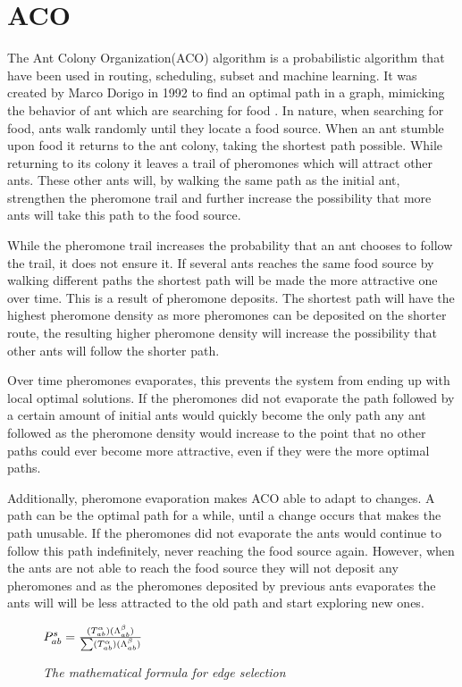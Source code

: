  
\section{ACO}
The Ant Colony Organization(ACO) algorithm is a probabilistic algorithm that have been used in routing, scheduling, 
subset and machine learning. It was created by Marco Dorigo in 1992 to find an optimal path in a graph, mimicking the
behavior of ant which are searching for food \cite{aco}. In nature, when searching for food, ants walk randomly until
they locate a food source. When an ant stumble upon food it returns to the ant colony, taking the shortest path possible.
While returning to its colony it leaves a trail of pheromones which will attract other ants. These other ants will, by walking
the same path as the initial ant, strengthen the pheromone trail and further increase the possibility that more ants will
take this path to the food source.

While the pheromone trail increases the probability that an ant chooses to follow the trail, it does not ensure it.
If several ants reaches the same food source by walking different paths the shortest path will be made the more attractive
one over time. This is a result of pheromone deposits. The shortest path will have the highest pheromone density as more
pheromones can be deposited on the shorter route, the resulting higher pheromone density will increase the possibility that 
other ants will follow the shorter path. 

Over time pheromones evaporates, this prevents the system from ending up with local optimal solutions. 
If the pheromones did not evaporate the path followed by a certain amount of initial ants
would quickly become the only path any ant followed as the pheromone density would increase to the point that no other paths
could ever become more attractive, even if they were the more optimal paths. 

Additionally, pheromone evaporation makes ACO able to adapt to changes. A path can be the optimal path for a while, until a change
occurs that makes the path unusable. If the pheromones did not evaporate the ants would continue to follow this path indefinitely,
never reaching the food source again. However, when the ants are not able to reach the food source they will not deposit any
pheromones and as the pheromones deposited by previous ants evaporates the ants will will be less attracted to the old path
and start exploring new ones.
 

\begin{figure}[h]
\centering
\begin{math}
P^s_{ab} = {(T^\alpha_{ab})(\Lambda^\beta_{ab}) \over \sum (T^\alpha_{ab})(\Lambda^\beta_{ab})}
\end{math}
\caption{\textit{The mathematical formula for edge selection}}
\label{fig:edge}
\end{figure}

